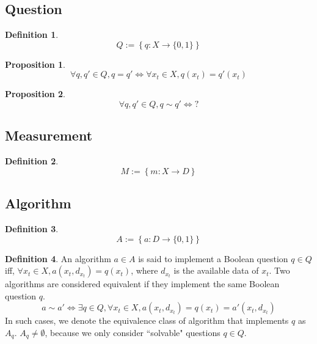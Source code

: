 \documentclass[11pt,a4paper]{article}
\newtheorem{pro}{Proposition}[section]
\theoremstyle{definition}
\newtheorem{defn}{Definition}[section]
\theoremstyle{remark}
\numberwithin{equation}{section}
\newcommand{\set}[1]{\left\lbrace #1 \right\rbrace}
\begin{document}
\subsection{Question}
\begin{defn}
\begin{equation}
Q:= \set{q: X \rightarrow \{0, 1\}}
\end{equation}
\end{defn}

\begin{pro}
\begin{equation}
\forall q,q'\in Q, q=q' \iff  \forall x_t \in X, q(x_t) = q'(x_t)
\end{equation}
\end{pro}

\begin{pro}
\begin{equation}
\forall q,q'\in Q, q\sim q' \iff ?
\end{equation}
\end{pro}


\subsection{Measurement}
\begin{defn}
\begin{equation}
M:=\set{m:X \rightarrow D}
\end{equation}
\end{defn}

\subsection{Algorithm}
\begin{defn}
\begin{equation}
A := \set{a: D \rightarrow \{0, 1\}}
\end{equation}
\end{defn}


\begin{defn}
An algorithm \( a \in A  \) is said to implement a Boolean question \( q \in Q  \) iff, $\forall  x_t \in X , a(x_t, d_{x_t}) = q(x_t) $, where $d_{x_t}$ is the available data of $x_t$.
Two algorithms are considered equivalent if they implement the same Boolean question $q$. 
\begin{equation}
a \sim a' \iff  
\exists q\in Q, \forall  x_t \in X , a(x_t, d_{x_t}) = q(x_t)  =a'(x_t, d_{x_t})
\end{equation}
In such cases, we denote the equivalence class of algorithm that implements $q$ as \( A_q \).
$A_q \neq \emptyset$, because we only consider ``solvable" questions $q\in Q$. 
\end{defn}
\end{document}
